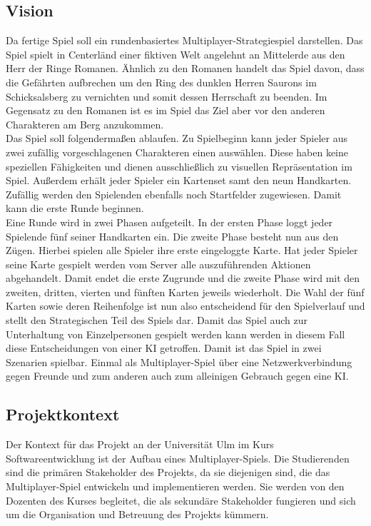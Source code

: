 \documentclass{uulm-assignment}
\begin{document}
    \subsection{Vision}
    Da fertige Spiel soll ein rundenbasiertes Multiplayer-Strategiespiel darstellen. Das Spiel spielt in Centerländ einer fiktiven Welt angelehnt an Mittelerde aus den Herr der Ringe Romanen.
Ähnlich zu den Romanen handelt das Spiel davon, dass die Gefährten aufbrechen um den Ring des dunklen Herren Saurons im Schicksalsberg zu vernichten und somit dessen Herrschaft zu beenden. Im Gegensatz zu den Romanen ist es im Spiel das Ziel aber vor den anderen Charakteren am Berg anzukommen. \\

Das Spiel soll folgendermaßen ablaufen. Zu Spielbeginn kann jeder Spieler aus zwei zufällig vorgeschlagenen Charakteren einen auswählen. Diese haben keine speziellen Fähigkeiten und dienen ausschließlich zu visuellen Repräsentation im Spiel. Außerdem erhält jeder Spieler ein Kartenset samt den neun Handkarten. Zufällig werden den Spielenden ebenfalls noch Startfelder zugewiesen. Damit kann die erste Runde beginnen.\\
Eine Runde wird in zwei Phasen aufgeteilt. In der ersten Phase loggt jeder Spielende fünf seiner Handkarten ein. Die zweite Phase besteht nun aus den Zügen. Hierbei spielen alle Spieler ihre erste eingeloggte Karte. Hat jeder Spieler seine Karte gespielt werden vom Server alle auszuführenden Aktionen abgehandelt. Damit endet die erste Zugrunde und die zweite Phase wird mit den zweiten, dritten, vierten und fünften Karten jeweils wiederholt. 
Die Wahl der fünf Karten sowie deren Reihenfolge ist nun also entscheidend für den Spielverlauf und stellt den Strategischen Teil des Spiels dar. Damit das Spiel auch zur Unterhaltung von Einzelpersonen gespielt werden kann werden in diesem Fall diese Entscheidungen von einer KI getroffen.
Damit ist das Spiel in zwei Szenarien spielbar. Einmal als Multiplayer-Spiel über eine Netzwerkverbindung gegen Freunde und zum anderen auch zum alleinigen Gebrauch gegen eine KI.
    \subsection{Projektkontext}
    Der Kontext für das Projekt an der Universität Ulm im Kurs Softwareentwicklung ist der Aufbau eines Multiplayer-Spiels. 
Die Studierenden sind die primären Stakeholder des Projekts, da sie diejenigen sind, die das Multiplayer-Spiel entwickeln und implementieren werden. Sie werden von den Dozenten des Kurses begleitet, die als sekundäre Stakeholder fungieren und sich um die Organisation und Betreuung des Projekts kümmern.
\end{document}
